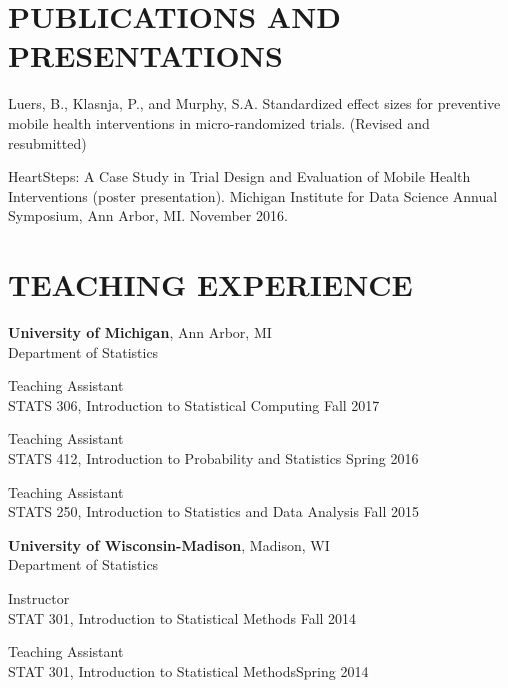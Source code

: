 \documentclass[letterpaper, 11pt]{article}
\begin{document}
\section{PUBLICATIONS AND PRESENTATIONS}

Luers, B., Klasnja, P., and Murphy, S.A. Standardized effect sizes for preventive mobile health interventions in micro-randomized trials. (Revised and resubmitted)

HeartSteps: A Case Study in Trial Design and Evaluation of Mobile Health Interventions (poster presentation). Michigan Institute for Data Science Annual Symposium, Ann Arbor, MI. November 2016.

\section{TEACHING EXPERIENCE}
{\bf University of Michigan}, Ann Arbor, MI \\
Department of Statistics

\hspace{15pt}Teaching Assistant\\
\hspace{15pt}STATS 306, Introduction to Statistical Computing \hfill Fall 2017

\hspace{15pt}Teaching Assistant\\
\hspace{15pt}STATS 412, Introduction to Probability and Statistics \hfill Spring 2016

\hspace{15pt}Teaching Assistant\\
\hspace{15pt}STATS 250, Introduction to Statistics and Data Analysis \hfill Fall 2015

\vspace{6pt}
{\bf University of Wisconsin-Madison}, Madison, WI\\
Department of Statistics

\hspace{15pt}Instructor\\
\hspace{15pt}STAT 301, Introduction to Statistical Methods \hfill Fall 2014

\hspace{15pt}Teaching Assistant\\
\hspace{15pt}STAT 301, Introduction to Statistical Methods\hfill Spring 2014
\end{document}
